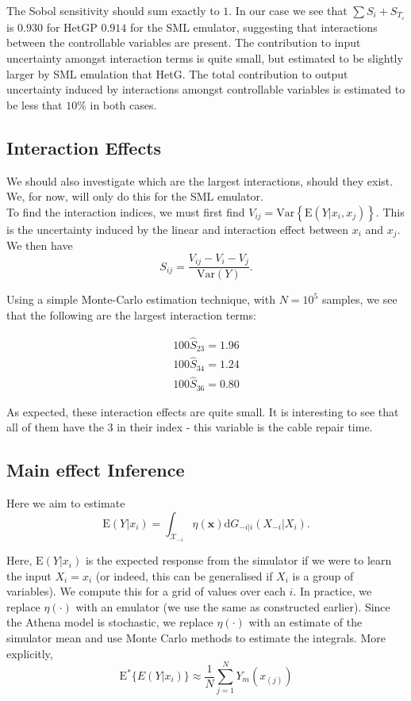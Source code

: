 \documentclass[12pt]{article}
\newcommand{\bx}{\textbf{x}}
\newcommand{\E}{\text{E}}
\newcommand{\var}{\text{Var}}
\newcommand{\dd}{\text{d}}
\begin{document}
The Sobol sensitivity should sum exactly to $1$. In our case we see that $\sum S_i + S_{T_\varepsilon}$ is $0.930$ for HetGP $0.914$ for the SML emulator, suggesting that interactions between the controllable variables are present. The contribution to input uncertainty amongst interaction terms is quite small, but estimated to be slightly larger by SML emulation that HetG.  The total contribution to output uncertainty induced by interactions amongst controllable variables is estimated to be less that $10\%$ in both cases. 

\subsection{Interaction Effects}

We should also investigate which are the largest interactions, should they exist. We, for now, will only do this for the SML emulator.\\

To find the interaction indices, we must first find $V_{ij} = \var \left\{ \E(Y | x_i, x_j) \right\}$. This is the uncertainty induced by the linear and interaction effect between $x_i$ and $x_j$. We then have 
\begin{equation}
S_{ij} = \frac{V_{ij} - V_i - V_j}{\var(Y)}.
\end{equation}

Using a simple Monte-Carlo estimation technique, with $N = 10^5$ samples, we see that the following are the largest interaction terms:

\begin{align*}
	100\hat{S}_{23} = 1.96 \\
	100\hat{S}_{34} = 1.24 \\
	100\hat{S}_{36} = 0.80
\end{align*}

As expected, these interaction effects are quite small. It is interesting to see that all of them have the $3$ in their index - this variable is the cable repair time.
\subsection{Main effect Inference}

Here we aim to  estimate
\begin{equation}
	\E(Y | x_i) = \int _{\mathcal{X}_{-i}} \eta(\bx) \dd G_{-i|i}(X_{-i} | X_i).
\end{equation}

Here, $\E(Y | x_i)$ is the expected response from the simulator if we were to learn the input $X_i = x_i$ (or indeed, this can be generalised if $X_i$ is a group of variables). We compute this for a grid of values over each $i$. In practice, we replace $\eta(\cdot)$ with an emulator (we use the same as constructed earlier). Since the Athena model is stochastic, we replace $\eta(\cdot)$ with an estimate of the simulator mean and use Monte Carlo methods to estimate the integrals. More explicitly, 
\begin{equation}
	\E^* \{ E(Y|x_i)\} \approx \frac{1}{N}\sum_{j=1}^N Y_m(x_{(j)})
\end{equation}
\end{document}
